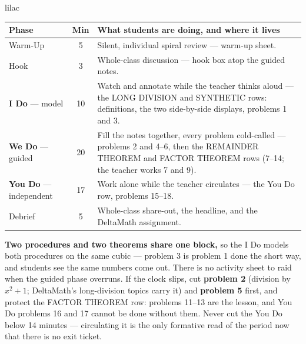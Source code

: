 \documentclass[10pt]{article}
\begin{document}
\boxguard[22]
\begin{skillbox}{lilac}
\small
\renewcommand{\arraystretch}{1.25}
\begin{tabularx}{\linewidth}{@{} l c X @{}}
\textbf{Phase} & \textbf{Min} & \textbf{What students are doing, and where it lives} \\
\midrule
Warm-Up                       & 5  & Silent, individual spiral review --- warm-up sheet. \\
Hook                          & 3  & Whole-class discussion --- hook box atop the guided notes. \\
\textbf{I Do} --- model       & 10 & Watch and annotate while the teacher thinks aloud --- the LONG DIVISION and SYNTHETIC rows: definitions, the two side-by-side displays, problems 1 and 3. \\
\textbf{We Do} --- guided     & 20 & Fill the notes together, every problem cold-called --- problems 2 and 4--6, then the REMAINDER THEOREM and FACTOR THEOREM rows (7--14; the teacher works 7 and 9). \\
\textbf{You Do} --- independent & 17 & Work alone while the teacher circulates --- the You Do row, problems 15--18. \\
Debrief                       & 5  & Whole-class share-out, the headline, and the DeltaMath assignment. \\
\end{tabularx}

\smallskip
\textbf{Two procedures and two theorems share one block,} so the I Do models both procedures
on the same cubic --- problem 3 is problem 1 done the short way, and students see the same
numbers come out. There is no activity sheet to raid when the guided phase overruns. If the
clock slips, cut \textbf{problem 2} (division by $x^2 + 1$; DeltaMath's long-division topics
carry it) and \textbf{problem 5} first, and protect the FACTOR THEOREM row: problems 11--13 are
the lesson, and You Do problems 16 and 17 cannot be done without them. Never cut the You Do
below 14 minutes --- circulating it is the only formative read of the period now that there is
no exit ticket.
\end{skillbox}
\end{document}

